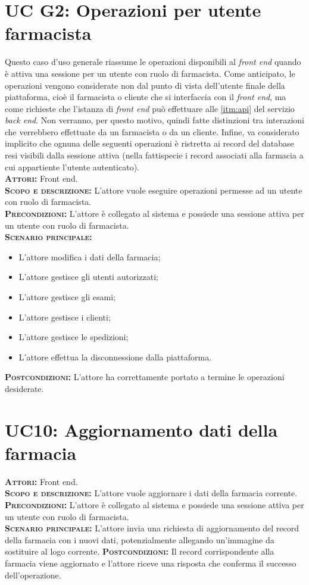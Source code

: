 \section{UC G2: Operazioni per utente farmacista}
\label{sec:UCG2}
Questo caso d'uso generale riassume le operazioni disponibili al \textit{front end} quando è attiva una sessione per un utente con ruolo di farmacista. Come anticipato, le operazioni vengono considerate non dal punto di vista dell'utente finale della piattaforma, cioè il farmacista o cliente che si interfaccia con il \textit{front end}, ma come richieste che l'istanza di \textit{front end} può effettuare alle \ref{itm:api} del servizio \textit{back end}. Non verranno, per questo motivo, quindi fatte distinzioni tra interazioni che verrebbero effettuate da un farmacista o da un cliente. Infine, va considerato implicito che ognuna delle seguenti operazioni è ristretta ai record del database resi visibili dalla sessione attiva (nella fattispecie i record associati alla farmacia a cui appartiente l'utente autenticato).\\
\textsc{\textbf{Attori:}} Front end.\\
\textsc{\textbf{Scopo e descrizione:}} L'attore vuole eseguire operazioni permesse ad un utente con ruolo di farmacista.\\
\textsc{\textsc{\textbf{Precondizioni:}}} L'attore è collegato al sistema e possiede una sessione attiva per un utente con ruolo di farmacista.\\
\textsc{\textbf{Scenario principale:}} 
\begin{itemize}
    \item L'attore modifica i dati della farmacia;
    \item L'attore gestisce gli utenti autorizzati;
    \item L'attore gestisce gli esami;
    \item L'attore gestisce i clienti;
    \item L'attore gestisce le spedizioni;
    \item L'attore effettua la disconnessione dalla piattaforma.
\end{itemize}
\textsc{\textbf{Postcondizioni:}} L'attore ha correttamente portato a termine le operazioni desiderate.

\section{UC10: Aggiornamento dati della farmacia}
\label{sec:UC10}
\textsc{\textbf{Attori:}} Front end.\\
\textsc{\textbf{Scopo e descrizione:}} L'attore vuole aggiornare i dati della farmacia corrente.\\
\textsc{\textsc{\textbf{Precondizioni:}}} L'attore è collegato al sistema e possiede una sessione attiva per un utente con ruolo di farmacista.\\
\textsc{\textbf{Scenario principale:}} L'attore invia una richiesta di aggiornamento del record della farmacia con i nuovi dati, potenzialmente allegando un'immagine da sostituire al logo corrente.
\textsc{\textbf{Postcondizioni:}} Il record corrispondente alla farmacia viene aggiornato e l'attore riceve una risposta che conferma il successo dell'operazione.

